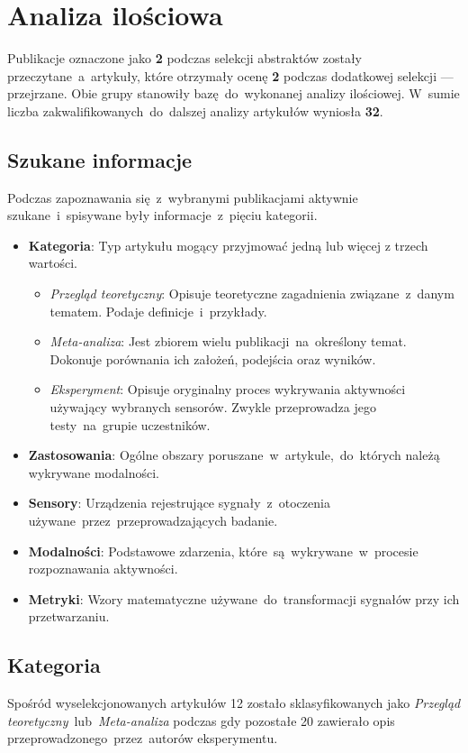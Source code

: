 \section{Analiza ilościowa}
Publikacje oznaczone jako {\bf 2} podczas selekcji abstraktów zostały przeczytane~a~artykuły, które otrzymały ocenę {\bf 2} podczas dodatkowej selekcji --- przejrzane. Obie grupy stanowiły bazę~do~wykonanej analizy ilościowej. W~sumie liczba zakwalifikowanych~do~dalszej analizy artykułów wyniosła {\bf 32}.

\subsection{Szukane informacje}
Podczas zapoznawania się~z~wybranymi publikacjami aktywnie szukane~i~spisywane były informacje~z~pięciu kategorii.
\begin{itemize}
    \item {\bf Kategoria}: Typ artykułu mogący przyjmować jedną lub więcej z trzech wartości.
    \begin{itemize}
		\item {\it Przegląd teoretyczny}: Opisuje teoretyczne zagadnienia związane~z~danym tematem. Podaje definicje~i~przykłady.
		\item {\it Meta-analiza}: Jest zbiorem wielu publikacji~na~określony temat. Dokonuje porównania ich założeń, podejścia oraz wyników.
		\item {\it Eksperyment}: Opisuje oryginalny proces wykrywania aktywności używający wybranych sensorów. Zwykle przeprowadza jego testy~na~grupie uczestników.
	\end{itemize}
    \item {\bf Zastosowania}: Ogólne obszary poruszane~w~artykule,~do~których należą wykrywane modalności.
    \item {\bf Sensory}: Urządzenia rejestrujące sygnały~z~otoczenia używane~przez~przeprowadzających badanie.
    \item {\bf Modalności}: Podstawowe zdarzenia, które~są~wykrywane~w~procesie rozpoznawania aktywności.
    \item {\bf Metryki}: Wzory matematyczne używane~do~transformacji sygnałów przy ich przetwarzaniu.
\end{itemize}

\subsection{Kategoria}
Spośród wyselekcjonowanych artykułów 12 zostało sklasyfikowanych jako \textit{Przegląd teoretyczny}~lub~\textit{Meta-analiza} podczas gdy pozostałe 20 zawierało opis przeprowadzonego~przez~autorów eksperymentu. 

